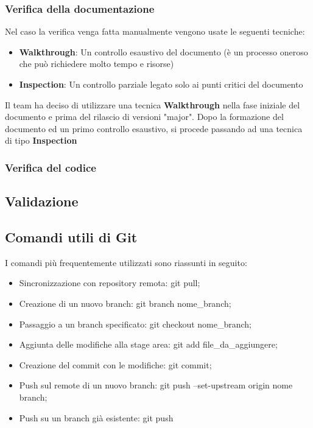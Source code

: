 \documentclass[12pt]{article}
\begin{document}
\subsubsection{Verifica della documentazione}
Nel caso la verifica venga fatta manualmente vengono usate le seguenti tecniche:
\begin{itemize}
    \item \textbf{Walkthrough}: Un controllo esaustivo del documento (è un processo oneroso che può richiedere molto tempo e risorse)
    \item \textbf{Inspection}: Un controllo parziale legato solo ai punti critici del documento
\end{itemize}
Il team ha deciso di utilizzare una tecnica \textbf{Walkthrough} nella fase iniziale del documento e prima del rilascio di versioni "major".
Dopo la formazione del documento ed un primo controllo esaustivo, si procede passando ad una tecnica di tipo \textbf{Inspection}

\subsubsection{Verifica del codice}

\subsection{Validazione}
\subsection{Comandi utili di Git}
I comandi più frequentemente utilizzati sono riassunti in seguito:
\begin{itemize}
    \item Sincronizzazione con repository remota: git pull;
    \item Creazione di un nuovo branch: git branch nome\_branch;
    \item Passaggio a un branch specificato: git checkout nome\_branch;
    \item Aggiunta delle modifiche alla stage area: git add file\_da\_aggiungere;
    \item Creazione del commit con le modifiche: git commit;
    \item Push sul remote di un nuovo branch: git push --set-upstream origin nome branch;
    \item Push su un branch già esistente: git push
\end{itemize}
\end{document}
